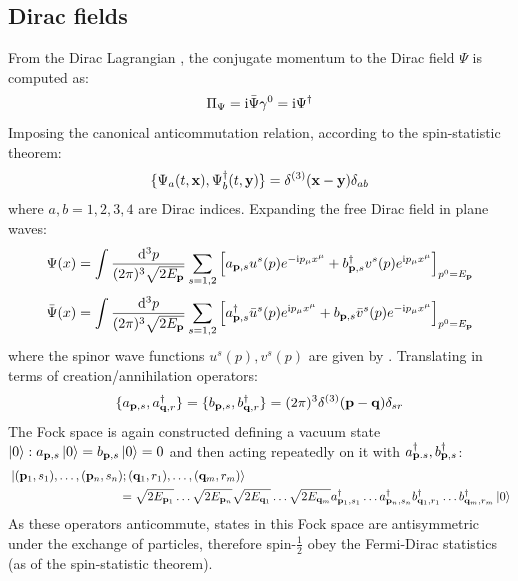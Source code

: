 \subsection{Dirac fields}

From the Dirac Lagrangian , the conjugate momentum to the Dirac field $ \Psi $ is computed as:
\begin{equation}
  \Pi_\Psi = \mathrm{i} \bar{\Psi} \gamma^0 = \mathrm{i} \Psi^\dagger
  \label{eq:dirac-conj-mom}
\end{equation}
Imposing the canonical anticommutation relation, according to the spin-statistic theorem:
\begin{equation}
  \{\Psi_a(t,\mathbf{x}) , \Psi_b^\dagger(t,\mathbf{y})\} = \delta^{(3)}(\mathbf{x} - \mathbf{y}) \delta_{ab}
  \label{eq:dirac-anticomm}
\end{equation}
where $ a,b = 1,2,3,4 $ are Dirac indices. Expanding the free Dirac field in plane waves:
\begin{equation}
  \Psi(x) = \int \frac{\mathrm{d}^3p}{(2\pi)^3 \sqrt{2E_{\mathbf{p}}}} \sum_{s = 1,2} \left[ a_{\mathbf{p},s} u^s(p) e^{-\mathrm{i} p_\mu x^\mu} + b_{\mathbf{p},s}^\dagger v^s(p) e^{\mathrm{i} p_\mu x^\mu} \right]_{p^0 = E_{\mathbf{p}}}
  \label{eq:dirac-exp}
\end{equation}
\begin{equation}
  \bar{\Psi}(x) = \int \frac{\mathrm{d}^3p}{(2\pi)^3 \sqrt{2E_{\mathbf{p}}}} \sum_{s = 1,2} \left[ a_{\mathbf{p},s}^\dagger \bar{u}^s(p) e^{\mathrm{i} p_\mu x^\mu} + b_{\mathbf{p},s} \bar{v}^s(p) e^{-\mathrm{i} p_\mu x^\mu} \right]_{p^0 = E_{\mathbf{p}}}
  \label{eq:dirac-bar-exp}
\end{equation}
where the spinor wave functions $ u^s(p) , v^s(p) $ are given by . Translating  in terms of creation/annihilation operators:
\begin{equation}
  \{a_{\mathbf{p},s} , a_{\mathbf{q},r}^\dagger\} = \{b_{\mathbf{p},s} , b_{\mathbf{q},r}^\dagger\} = (2\pi)^3 \delta^{(3)}(\mathbf{p} - \mathbf{q}) \delta_{sr}
\end{equation}
The Fock space is again constructed defining a vacuum state $ \ket{0} : a_{\mathbf{p},s} \ket{0} = b_{\mathbf{p},s} \ket{0} = 0 $ and then acting repeatedly on it with $ a_{\mathbf{p}.s}^\dagger , b_{\mathbf{p},s}^\dagger $:
\begin{equation*}
  \begin{split}
    &\ket{(\mathbf{p}_1,s_1) , \dots , (\mathbf{p}_n,s_n) ; (\mathbf{q}_1,r_1) , \dots , (\mathbf{q}_m,r_m)} \\
    & \qquad \qquad \qquad \qquad \quad = \sqrt{2E_{\mathbf{p}_1}} \dots \sqrt{2E_{\mathbf{p}_n}} \sqrt{2E_{\mathbf{q}_1}} \dots \sqrt{2E_{\mathbf{q}_m}} a_{\mathbf{p}_1,s_1}^\dagger \dots a_{\mathbf{p}_n,s_n}^\dagger b_{\mathbf{q}_1,r_1}^\dagger \dots b_{\mathbf{q}_m,r_m}^\dagger \ket{0}
  \end{split}
\end{equation*}
As these operators anticommute, states in this Fock space are antisymmetric under the exchange of particles, therefore spin-$ \frac{1}{2} $ obey the Fermi-Dirac statistics (as of the spin-statistic theorem).

